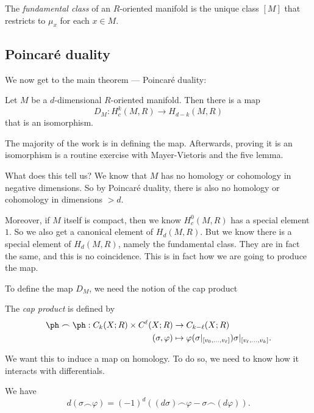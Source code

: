 \documentclass[a4paper]{article}
\begin{document}
\begin{defi}
  The \emph{fundamental class} of an $R$-oriented manifold is the unique class $[M]$ that restricts to $\mu_x$ for each $x \in M$.
\end{defi}

\subsection{\texorpdfstring{Poincar\'e}{Poincare} duality}
We now get to the main theorem --- Poincar\'e duality:
\begin{thm}
  Let $M$ be a $d$-dimensional $R$-oriented manifold. Then there is a map
  \[
    D_M: H^k_c(M, R) \to H_{d - k}(M, R)
  \]
  that is an isomorphism.
\end{thm}
The majority of the work is in defining the map. Afterwards, proving it is an isomorphism is a routine exercise with Mayer-Vietoris and the five lemma.

What does this tell us? We know that $M$ has no homology or cohomology in negative dimensions. So by Poincar\'e duality, there is also no homology or cohomology in dimensions $> d$.

Moreover, if $M$ itself is compact, then we know $H^0_c(M, R)$ has a special element $1$. So we also get a canonical element of $H_d(M, R)$. But we know there is a special element of $H_d(M, R)$, namely the fundamental class. They are in fact the same, and this is no coincidence. This is in fact how we are going to produce the map.

To define the map $D_M$, we need the notion of the cap product
\begin{defi}
  The \emph{cap product} is defined by
  \begin{align*}
    \ph \frown \ph : C_k(X; R) \times C^\ell(X; R) &\to C_{k - \ell} (X; R)\\
    (\sigma, \varphi) &\mapsto \varphi(\sigma|_{[v_0, \ldots, v_\ell]}) \sigma|_{[v_{\ell}, \ldots, v_k]}.
  \end{align*}
\end{defi}
We want this to induce a map on homology. To do so, we need to know how it interacts with differentials.
\begin{lemma}
  We have
  \[
    d(\sigma \frown \varphi) = (-1)^d ((d \sigma) \frown \varphi - \sigma \frown (d \varphi)).
  \]
\end{lemma}
\end{document}
